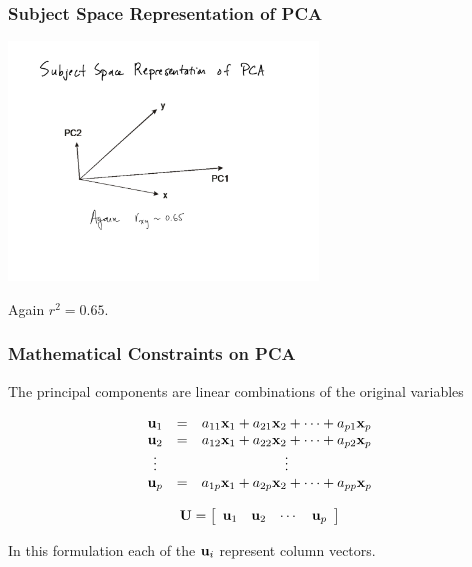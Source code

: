 \documentclass{beamer}
\begin{document}
\begin{frame}
  \frametitle{Subject Space Representation of PCA}

\begin{center}
\includegraphics[height=2.5in]{pca-subject-space}
\smallskip

Again $r^2 = 0.65$.

\end{center}  

\end{frame}


\begin{frame}
  \frametitle{Mathematical Constraints on PCA}

The principal components are linear combinations of the original variables
\medskip

\[ \begin{array}{ccc}
\mathbf{u}_1 & = & a_{11}\mathbf{x}_1 + a_{21}\mathbf{x}_2 + \cdots + a_{p1}\mathbf{x}_p \\
\mathbf{u}_2 & = & a_{12}\mathbf{x}_1 + a_{22}\mathbf{x}_2 + \cdots + a_{p2}\mathbf{x}_p \\
\vdots & & \vdots \\
\mathbf{u}_p & = & a_{1p}\mathbf{x}_1 + a_{2p}\mathbf{x}_2 + \cdots + a_{pp}\mathbf{x}_p \\
\end{array}
\]

\bigskip

\[
\mathbf{U}  =  \left[ \begin{array}{cccc}
\mathbf{u}_1 & \mathbf{u}_2 & \cdots &  \mathbf{u}_p\\
\end{array} \right]
\]

In this formulation each of the $\mathbf{u}_i$ represent column vectors.


\end{frame}
\end{document}
